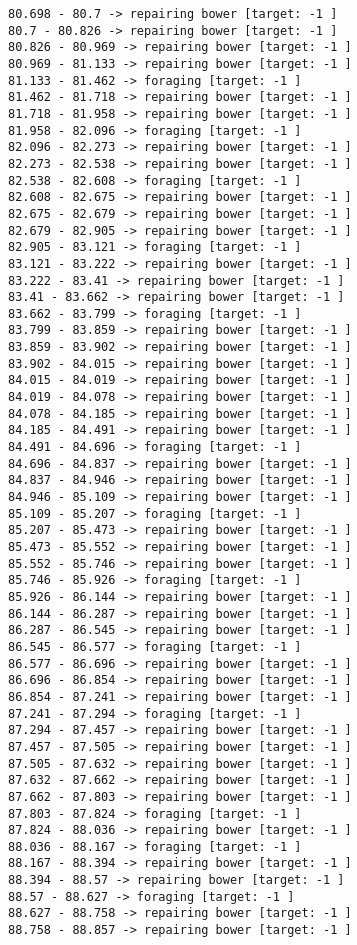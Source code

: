 \documentclass[11pt]{article}
\begin{document}
\begin{Verbatim}[commandchars=\\\{\}]
80.698 - 80.7 -> repairing bower [target: -1 ]
80.7 - 80.826 -> repairing bower [target: -1 ]
80.826 - 80.969 -> repairing bower [target: -1 ]
80.969 - 81.133 -> repairing bower [target: -1 ]
81.133 - 81.462 -> foraging [target: -1 ]
81.462 - 81.718 -> repairing bower [target: -1 ]
81.718 - 81.958 -> repairing bower [target: -1 ]
81.958 - 82.096 -> foraging [target: -1 ]
82.096 - 82.273 -> repairing bower [target: -1 ]
82.273 - 82.538 -> repairing bower [target: -1 ]
82.538 - 82.608 -> foraging [target: -1 ]
82.608 - 82.675 -> repairing bower [target: -1 ]
82.675 - 82.679 -> repairing bower [target: -1 ]
82.679 - 82.905 -> repairing bower [target: -1 ]
82.905 - 83.121 -> foraging [target: -1 ]
83.121 - 83.222 -> repairing bower [target: -1 ]
83.222 - 83.41 -> repairing bower [target: -1 ]
83.41 - 83.662 -> repairing bower [target: -1 ]
83.662 - 83.799 -> foraging [target: -1 ]
83.799 - 83.859 -> repairing bower [target: -1 ]
83.859 - 83.902 -> repairing bower [target: -1 ]
83.902 - 84.015 -> repairing bower [target: -1 ]
84.015 - 84.019 -> repairing bower [target: -1 ]
84.019 - 84.078 -> repairing bower [target: -1 ]
84.078 - 84.185 -> repairing bower [target: -1 ]
84.185 - 84.491 -> repairing bower [target: -1 ]
84.491 - 84.696 -> foraging [target: -1 ]
84.696 - 84.837 -> repairing bower [target: -1 ]
84.837 - 84.946 -> repairing bower [target: -1 ]
84.946 - 85.109 -> repairing bower [target: -1 ]
85.109 - 85.207 -> foraging [target: -1 ]
85.207 - 85.473 -> repairing bower [target: -1 ]
85.473 - 85.552 -> repairing bower [target: -1 ]
85.552 - 85.746 -> repairing bower [target: -1 ]
85.746 - 85.926 -> foraging [target: -1 ]
85.926 - 86.144 -> repairing bower [target: -1 ]
86.144 - 86.287 -> repairing bower [target: -1 ]
86.287 - 86.545 -> repairing bower [target: -1 ]
86.545 - 86.577 -> foraging [target: -1 ]
86.577 - 86.696 -> repairing bower [target: -1 ]
86.696 - 86.854 -> repairing bower [target: -1 ]
86.854 - 87.241 -> repairing bower [target: -1 ]
87.241 - 87.294 -> foraging [target: -1 ]
87.294 - 87.457 -> repairing bower [target: -1 ]
87.457 - 87.505 -> repairing bower [target: -1 ]
87.505 - 87.632 -> repairing bower [target: -1 ]
87.632 - 87.662 -> repairing bower [target: -1 ]
87.662 - 87.803 -> repairing bower [target: -1 ]
87.803 - 87.824 -> foraging [target: -1 ]
87.824 - 88.036 -> repairing bower [target: -1 ]
88.036 - 88.167 -> foraging [target: -1 ]
88.167 - 88.394 -> repairing bower [target: -1 ]
88.394 - 88.57 -> repairing bower [target: -1 ]
88.57 - 88.627 -> foraging [target: -1 ]
88.627 - 88.758 -> repairing bower [target: -1 ]
88.758 - 88.857 -> repairing bower [target: -1 ]

\end{Verbatim}
\end{document}
